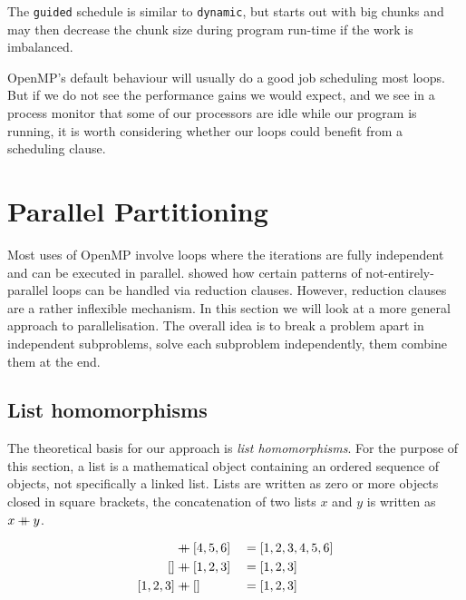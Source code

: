 The \texttt{guided} schedule is similar to \texttt{dynamic}, but
starts out with big chunks and may then decrease the chunk size during
program run-time if the work is imbalanced.

OpenMP's default behaviour will usually do a good job scheduling most
loops.  But if we do not see the performance gains we would expect,
and we see in a process monitor that some of our processors are idle
while our program is running, it is worth considering whether our
loops could benefit from a scheduling clause.

\section{Parallel Partitioning}
\label{sec:parallel-partitioning}

Most uses of OpenMP involve loops where the iterations are fully
independent and can be executed in parallel. 
showed how certain patterns of not-entirely-parallel loops can be
handled via reduction clauses. However, reduction clauses are a rather
inflexible mechanism. In this section we will look at a more general
approach to parallelisation. The overall idea is to break a problem
apart in independent subproblems, solve each subproblem independently,
them combine them at the end.

\subsection{List homomorphisms}
\label{sec:list-homomorphisms}

\newcommand\concat{\mathbin{+\mkern-10mu+}}

The theoretical basis for our approach is \emph{list homomorphisms}.
For the purpose of this section, a list is a mathematical object
containing an ordered sequence of objects, not specifically a linked
list. Lists are written as zero or more objects closed in square
brackets, the concatenation of two lists $x$ and $y$ is written as
$x\concat y$.

\begin{example}
  \begin{align}
    [1,2,3]&\concat[4,5,6] &&= [1,2,3,4,5,6] \\
    []&\concat[1,2,3] &&= [1,2,3] \\
    [1,2,3]&\concat[] &&= [1,2,3]
  \end{align}
\end{example}

